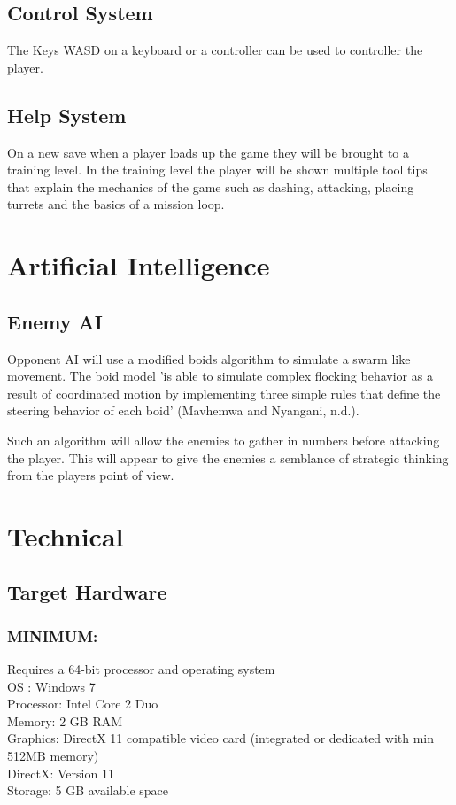 \documentclass{article}
\begin{document}
\subsection{Control System}
\label{sec:org2817073}
The Keys WASD on a keyboard or a controller can be used to controller the player.
\subsection{Help System}
\label{sec:orgf8792e9}
On a new save when a player loads up the game they will be brought to a training level.
In the training level the player will be shown multiple tool tips that explain the mechanics of the game such as dashing, attacking, placing turrets and the basics of a mission loop.
\section{Artificial Intelligence}
\label{sec:org230e117}
\subsection{Enemy AI}
\label{sec:org7d056b4}
Opponent AI will use a modified boids algorithm to simulate a swarm like movement.
The boid model 'is able to simulate complex flocking behavior as a result of coordinated motion by implementing three simple rules that define the steering behavior of each boid' (Mavhemwa and Nyangani, n.d.).

Such an algorithm will allow the enemies to gather in numbers before attacking the player.
This will appear to give the enemies a semblance of strategic thinking from the players point of view.
\section{Technical}
\label{sec:org021312a}
\subsection{Target Hardware}
\label{sec:orgc3644df}
\subsubsection{MINIMUM:}
\label{sec:orga9a22e3}
Requires a 64-bit processor and operating system \\[0pt]
OS : Windows 7 \\[0pt]
Processor: Intel Core 2 Duo \\[0pt]
Memory: 2 GB RAM \\[0pt]
Graphics: DirectX 11 compatible video card (integrated or dedicated with min 512MB memory) \\[0pt]
DirectX: Version 11 \\[0pt]
Storage: 5 GB available space
\end{document}
